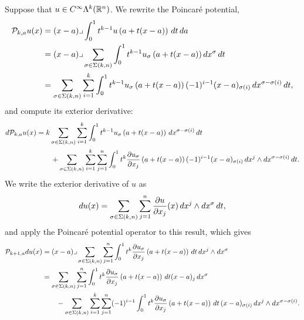 \documentclass[10pt,a4paper]{article}
\begin{document}
Suppose that $u \in C^{\infty}\Lambda^{k}({\mathbb R}^n)$.
We rewrite the Poincar\'e potential,
\begin{align*}
    {\mathcal P}_{k,a} u(x) 
    &= 
    (x-a)\lrcorner \int_{0}^{1} t^{k-1} u\left(a+t(x-a)\right)\,dt\,da\;
    \\&
    = 
    (x-a)\lrcorner 
    \sum_{\sigma \in \Sigma(k,n)}
    \int_{0}^{1} 
    t^{k-1} u_{\sigma}\left(a+t(x-a)\right) dx^{\sigma} \,dt 
    \\&
    = 
    \sum_{\sigma \in \Sigma(k,n)} \sum_{i=1}^{k}
    \int_{0}^{1} 
    t^{k-1} u_{\sigma}\left(a+t(x-a)\right) (-1)^{i-1} (x-a)_{\sigma(i) } \,dx^{\sigma-\sigma(i)} \,dt 
    ,
\end{align*}
and compute its exterior derivative:
\begin{align*}
    d {\mathcal P}_{k,a} u(x) 
    &= 
    k
    \sum_{\sigma \in \Sigma(k,n)} \sum_{i=1}^{k}
    \int_{0}^{1} 
    t^{k-1} u_{\sigma}\left(a+t(x-a)\right) \,dx^{\sigma-\sigma(i)} \,dt 
    \\&\qquad
    + 
    \sum_{\sigma \in \Sigma(k,n)} \sum_{i=1}^{k} \sum_{j=1}^{n}
    \int_{0}^{1} 
    t^{k} \frac{ \partial u_{\sigma} }{\partial x_{j}}\left(a+t(x-a)\right) (-1)^{i-1} (x-a)_{\sigma(i) } \,dx^{j} \wedge dx^{\sigma-\sigma(i)} \,dt 
    .
\end{align*}
We write the exterior derivative of $u$ as 
\begin{align*}
    d u(x)
    =
    \sum_{\sigma \in \Sigma(k,n)} \sum_{j=1}^{n}
    \frac{ \partial u }{\partial x_{j}}(x) \,dx^{j} \wedge dx^{\sigma} \,dt 
    ,
\end{align*}
and apply the Poincar\'e potential operator to this result, which gives 
\begin{align*}
    {\mathcal P}_{k+1,a} d u(x)
    &=
    (x-a)\lrcorner 
    \sum_{\sigma \in \Sigma(k,n)} \sum_{j=1}^{n}
    \int_{0}^{1} t^{k} \frac{ \partial u_{\sigma} }{\partial x_{j}}\left(a+t(x-a)\right) \,dt 
    \,dx^{j} \wedge dx^{\sigma}
    \\&
    = 
    \sum_{\sigma \in \Sigma(k,n)} \sum_{j=1}^{n}
    \int_{0}^{1} t^{k} \frac{ \partial u_{\sigma} }{\partial x_{j}}\left(a+t(x-a)\right) \,dt (x-a)_{j}
    \,dx^{\sigma}
    \\&\qquad 
    - 
    \sum_{\sigma \in \Sigma(k,n)} \sum_{i=1}^{k} \sum_{j=1}^{n}
    (-1)^{i-1}
    \int_{0}^{1} t^{k} \frac{ \partial u_{\sigma} }{\partial x_{j}}\left(a+t(x-a)\right) \,dt 
    \,(x-a)_{\sigma(i)} 
    \,dx^{j} \wedge dx^{\sigma-\sigma(i)}
    .
\end{align*}
\end{document}
